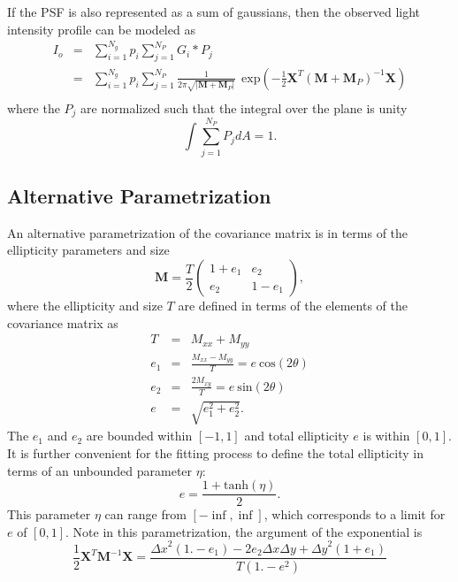 \documentclass[12pt,preprint]{aastex}
\newcommand{\M}{\textbf{M}}
\newcommand{\X}{\textbf{X}}
\newcommand{\Dx}{\ensuremath{\Delta x}}
\newcommand{\Dy}{\ensuremath{\Delta y}}
\begin{document}
If the PSF is also represented as a sum of gaussians, then the observed
light intensity profile can be modeled as
\begin{eqnarray}
I_o & = & \sum_{i=1}^{N_{g}} p_i \sum_{j=1}^{N_{P}} G_i * P_j \\
    & = & \sum_{i=1}^{N_{g}} p_i \sum_{j=1}^{N_{P}} \frac{1}{2 \pi \sqrt{|\M + \M_P|} } ~~ \textrm{exp}\left( -\frac{1}{2} \X^T (\M+\M_P)^{-1} \X \right) \\
\end{eqnarray}
where the $P_j$ are normalized such that the integral over
the plane is unity
\begin{equation}
\int \sum_{j=1}^{N_{P}} P_j dA = 1.
\end{equation}

\subsection{Alternative Parametrization}

An alternative parametrization of the covariance matrix is in
terms of the ellipticity parameters and size
\begin{equation}
\M = \frac{T}{2}\left( \begin{array}{cc}
1+e_1 & e_2 \\
e_2 & 1-e_1 \end{array} \right),
\end{equation}
where the ellipticity and size $T$ are defined in terms
of the elements of the covariance matrix as
\begin{eqnarray}
T & = & M_{xx} + M_{yy} \\
e_1 & = & \frac{M_{xx}-M_{yy}}{T} = e~\mathrm{cos}(2 \theta) \\
e_2 & = & \frac{2 M_{xy}}{T} = e~\mathrm{sin}(2 \theta)\\
e & = & \sqrt{e_1^2 + e_2^2}.
\end{eqnarray}
The $e_1$ and $e_2$ are bounded within $[-1,1]$ and total ellipticity $e$ is
within $[0,1]$.  It is further convenient for the fitting process to define the
total ellipticity in terms of an unbounded parameter $\eta$:
\begin{equation}
e = \frac{1+\mathrm{tanh}(\eta)}{2}.
\end{equation}
This parameter $\eta$ can range from $[-\inf,\inf]$, which corresponds
to a limit for $e$ of $[0,1]$. Note in this parametrization, 
the argument of the exponential is
\begin{equation}
\frac{1}{2} \X^T \M^{-1} \X = \frac{\Dx^2 (1.-e_1) - 2 e_2 \Dx \Dy + \Dy^2 (1+e_1)}{T (1.-e^2)}
\end{equation}
\end{document}
